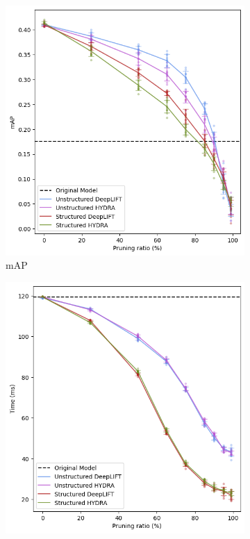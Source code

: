 \documentclass[10pt]{cai}
\begin{document}
\begin{figure}
    \centering
    \captionsetup{justification=centering,margin=1cm}
    \begin{subfigure}[b]{.45\textwidth}
      \centering
      \includegraphics[width=1\linewidth]{figs/mAP1.PNG}
      \caption{mAP}
      \label{fig:mAP1}
    \end{subfigure}%
    \begin{subfigure}[b]{.45\textwidth}
      \centering
      \includegraphics[width=1\linewidth]{figs/time1.PNG}

\end{subfigure}
\end{figure}
\end{document}
